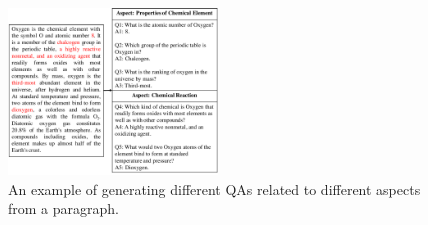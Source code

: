 \begin{figure}[th]
    \centering
    \includegraphics[width=0.495\textwidth]{pic/example.pdf}
    \caption{\label{fig:example} An example of generating different QAs related to different aspects from a paragraph. }
\end{figure}



